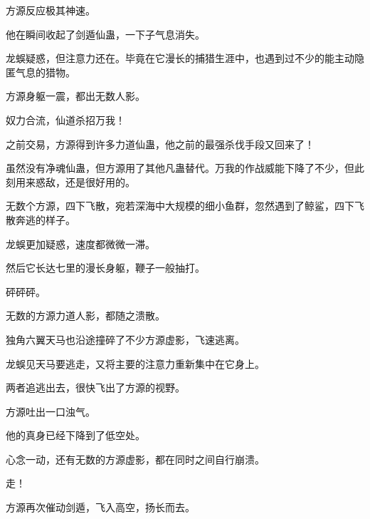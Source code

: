 \begin{this_body}
方源反应极其神速。

他在瞬间收起了剑遁仙蛊，一下子气息消失。

龙蜈疑惑，但注意力还在。毕竟在它漫长的捕猎生涯中，也遇到过不少的能主动隐匿气息的猎物。

方源身躯一震，都出无数人影。

奴力合流，仙道杀招万我！

之前交易，方源得到许多力道仙蛊，他之前的最强杀伐手段又回来了！

虽然没有净魂仙蛊，但方源用了其他凡蛊替代。万我的作战威能下降了不少，但此刻用来惑敌，还是很好用的。

无数个方源，四下飞散，宛若深海中大规模的细小鱼群，忽然遇到了鲸鲨，四下飞散奔逃的样子。

龙蜈更加疑惑，速度都微微一滞。

然后它长达七里的漫长身躯，鞭子一般抽打。

砰砰砰。

无数的方源力道人影，都随之溃散。

独角六翼天马也沿途撞碎了不少方源虚影，飞速逃离。

龙蜈见天马要逃走，又将主要的注意力重新集中在它身上。

两者追逃出去，很快飞出了方源的视野。

方源吐出一口浊气。

他的真身已经下降到了低空处。

心念一动，还有无数的方源虚影，都在同时之间自行崩溃。

走！

方源再次催动剑遁，飞入高空，扬长而去。

\end{this_body}

